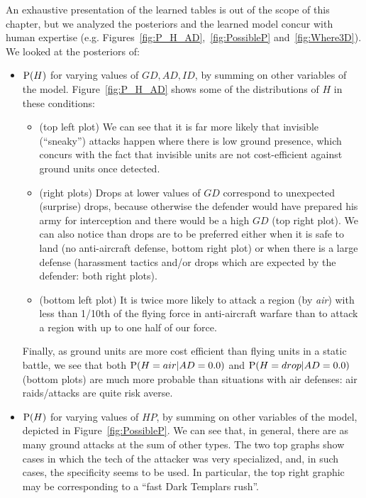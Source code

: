 An exhaustive presentation of the learned tables is out of the scope of this chapter, but we analyzed the posteriors and the learned model concur with human expertise (e.g. Figures~\ref{fig:P_H_AD},~\ref{fig:PossibleP} and~\ref{fig:Where3D}). We looked at the posteriors of:
\begin{itemize}
    \item $\mathrm{P}(H)$ for varying values of $GD,AD,ID$, by summing on other variables of the model. Figure~\ref{fig:P_H_AD} shows some of the distributions of $H$ in these conditions: 
\begin{itemize}
    \item (top left plot) We can see that it is far more likely that invisible (``sneaky'') attacks happen where there is low ground presence, which concurs with the fact that invisible units are not cost-efficient against ground units once detected.

    \item (right plots) Drops at lower values of $GD$ correspond to unexpected (surprise) drops, because otherwise the defender would have prepared his army for interception and there would be a high $GD$ (top right plot). We can also notice than drops are to be preferred either when it is safe to land (no anti-aircraft defense, bottom right plot) or when there is a large defense (harassment tactics and/or drops which are expected by the defender: both right plots).

    \item (bottom left plot) It is twice more likely to attack a region (by \textit{air}) with less than 1/10th of the flying force in anti-aircraft warfare than to attack a region with up to one half of our force. 
\end{itemize}
Finally, as ground units are more cost efficient than flying units in a static battle, we see that both $\mathrm{P}(H=air|AD=0.0)$ and $\mathrm{P}(H=drop|AD=0.0)$ (bottom plots) are much more probable than situations with air defenses: air raids/attacks are quite risk averse. 



    \item $\mathrm{P}(H)$ for varying values of $HP$, by summing on other variables of the model, depicted in Figure~\ref{fig:PossibleP}. 
We can see that, in general, there are as many ground attacks at the sum of other types. The two top graphs show cases in which the tech of the attacker was very specialized, and, in such cases, the specificity seems to be used. In particular, the top right graphic may be corresponding to a ``fast Dark Templars rush''. 


\end{itemize}
